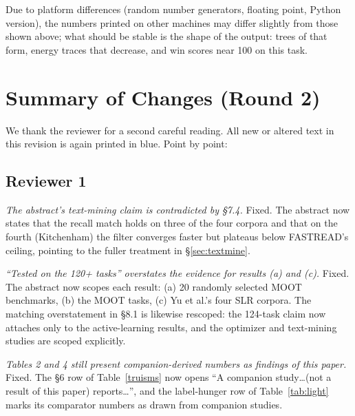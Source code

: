 \documentclass[AMA,STIX2COL]{WileyNJDv5}
\begin{document}
Due to platform differences (random number generators, floating
point, Python version), the numbers printed on other machines
may differ slightly from those shown above; what should be
stable is the shape of the output: trees of that form, energy
traces that decrease, and \textsf{win} scores near 100 on this
task.
\color{black}




\clearpage

\section*{Summary of Changes (Round 2)}
\color{newblue}
We thank the reviewer for a second careful reading. All new or
altered text in this revision is again printed in blue. Point by
point:

\subsection*{Reviewer 1}

\smallskip{} {\em The abstract's text-mining claim is
contradicted by \S7.4.} Fixed. The abstract now states that the
recall match holds on three of the four corpora and that on the
fourth (Kitchenham) the filter converges faster but plateaus
below FASTREAD's ceiling, pointing to the fuller treatment in
\S\ref{sec:textmine}.

\smallskip{} {\em ``Tested on the 120+ tasks'' overstates
the evidence for results (a) and (c).} Fixed. The abstract now
scopes each result: (a) 20 randomly selected MOOT benchmarks,
(b) the MOOT tasks, (c) Yu et al.'s four SLR corpora. The
matching overstatement in \S8.1 is likewise rescoped: the
124-task claim now attaches only to the active-learning results,
and the optimizer and text-mining studies are scoped explicitly.

\smallskip{} {\em Tables 2 and 4 still present
companion-derived numbers as findings of this paper.} Fixed. The
\S6 row of Table~\ref{truisms} now opens ``A companion
study\ldots (not a result of this paper) reports\ldots'', and the
label-hunger row of Table~\ref{tab:light} marks its comparator
numbers as drawn from companion studies.
\end{document}
